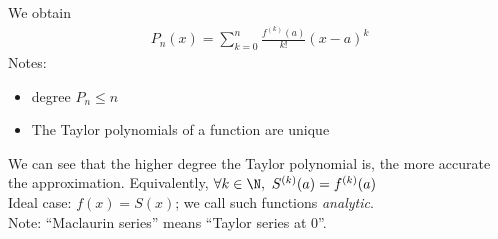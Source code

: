 We obtain \begin{align*}
    \boxed{P_n(x) = \sum_{k = 0}^{n} \frac{f^{(k)}(a)}{k!} (x-a)^k}
\end{align*}
Notes: \begin{itemize}
    \item degree \(P_n \leq n\)
    \item The Taylor polynomials of a function are unique
\end{itemize}
We can see that the higher degree the Taylor polynomial is, the more accurate the approximation.
Equivalently, \(\forall k \in \N,~ S^{(k)}(a) = f^{(k)}(a)\) \\
Ideal case: \(f(x) = S(x)\); we call such functions \emph{analytic}. \\
Note: ``Maclaurin series'' means ``Taylor series at \(0\)''.



\newpage

